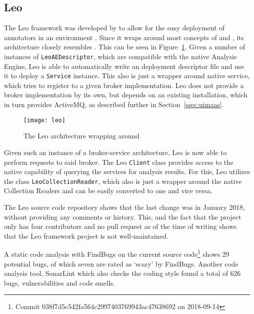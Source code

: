 \subsection{Leo}
\label{ssec:leo}
The Leo framework was developed by \vinci{} to allow for the easy deployment of annotators in an \uimaas{} environment \cite{leo}. Since it wraps around most concepts of \uima{} and \uimaas{}, its architecture closely resembles \uimaas{}. This can be seen in Figure~\ref{fig:leo}. Given a number of instances of \lstinline|LeoAEDescriptor|, which are compatible with the native \uima{} Analysis Engine, Leo is able to automatically write an \uimaas{} deployment descriptor file and use it to deploy a \lstinline|Service| instance. This also is just a wrapper around \uimaas{} native service, which tries to register to a given broker implementation. Leo does not provide a broker implementation by its own, but depends on an existing \uimaas{} installation, which in turn provides ActiveMQ, as described further in Section~\ref{ssec:uimaas}.
\begin{figure}[hbt]
	\centering
	\texttt{[image: leo]}
	\caption[The Leo architecture wrapping around UIMA-AS.]{The Leo architecture wrapping around \uimaas{} \cite{leo}}
	\label{fig:leo}
\end{figure}
Given such an instance of a broker-service architecture, Leo is now able to perform requests to said broker. The Leo \lstinline|Client| class provides access to the native \uimaas{} capability of querying the services for analysis results. For this, Leo utilizes the class \lstinline|LeoCollectionReader|, which also is just a wrapper around the native \uima{} Collection Readers and can be easily converted to one and vice versa.

The Leo source code repository shows that the last change was in January 2018, without providing any comments or history. This, and the fact that the project only has four contributors and no pull request as of the time of writing shows that the Leo framework project is not well-maintained.

A static code analysis with FindBugs on the current source code\footnote{Commit 038f7d5c542fa564c2997403769943ac47638692 on 2018-09-14} shows 29 potential bugs, of which seven are rated as `scary' by FindBugs. Another code analysis tool, SonarLint which also checks the coding style found a total of 626 bugs, vulnerabilities and code smells. 

